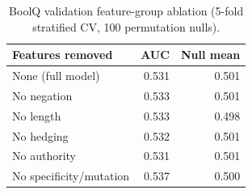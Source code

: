\begin{table}[t]
\centering
\caption{BoolQ validation feature-group ablation (5-fold stratified CV, 100 permutation nulls).}
\label{tab:boolq_ablation}
\begin{tabular}{lrr}
\toprule
Features removed & AUC & Null mean \\
\midrule
None (full model) & 0.531 & 0.501 \\
No negation & 0.533 & 0.501 \\
No length & 0.533 & 0.498 \\
No hedging & 0.532 & 0.501 \\
No authority & 0.531 & 0.501 \\
No specificity/mutation & 0.537 & 0.500 \\
\bottomrule
\end{tabular}
\end{table}
